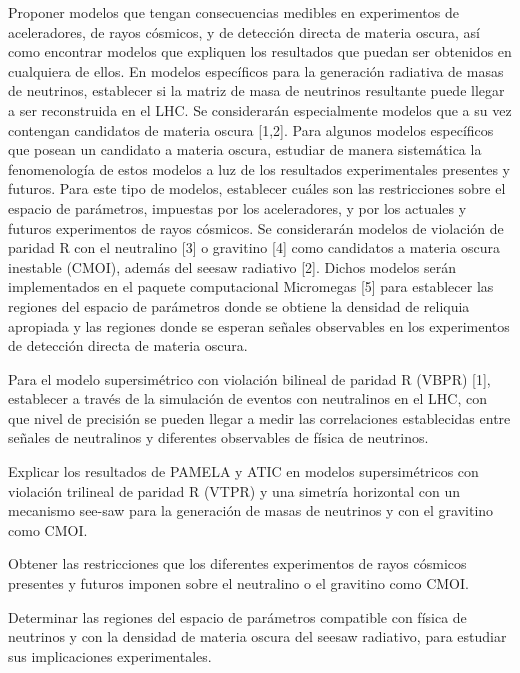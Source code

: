 \begin{ideas}
  

Proponer modelos que tengan consecuencias medibles en experimentos de aceleradores, de rayos cósmicos, y de detección directa de materia oscura, así como encontrar modelos que expliquen los resultados que puedan ser obtenidos en cualquiera de ellos. En modelos específicos para la generación radiativa de masas de neutrinos, establecer si la matriz de masa de neutrinos resultante puede llegar a ser reconstruida en el LHC. Se considerarán especialmente modelos que a su vez contengan candidatos de materia oscura [1,2]. Para algunos modelos específicos que posean un candidato a materia oscura, estudiar de manera sistemática la fenomenología de estos modelos a luz de los resultados experimentales presentes y futuros. Para este tipo de modelos, establecer cuáles son las restricciones sobre el espacio de parámetros, impuestas por los aceleradores, y por los actuales y futuros experimentos de rayos cósmicos. Se considerarán modelos de violación de paridad R con el neutralino [3] o gravitino [4] como candidatos a materia oscura inestable (CMOI), además del seesaw radiativo [2]. Dichos modelos serán implementados en el paquete computacional Micromegas [5] para establecer las regiones del espacio de parámetros donde se obtiene la densidad de reliquia apropiada y las regiones donde se esperan señales observables en los experimentos de detección directa de materia oscura. 


Para el modelo supersimétrico con violación bilineal de paridad R (VBPR) [1],  establecer a través de la simulación de eventos con neutralinos en el LHC, con que nivel de precisión se pueden llegar a medir las correlaciones establecidas entre señales de neutralinos y diferentes observables de física de neutrinos.

Explicar los resultados de PAMELA y ATIC en modelos supersimétricos con violación trilineal de paridad R (VTPR) y una simetría horizontal con un mecanismo see-saw para la generación de masas de neutrinos y con el gravitino como CMOI.

Obtener las restricciones que los diferentes experimentos de rayos cósmicos presentes y futuros imponen sobre el neutralino o el gravitino como CMOI.

Determinar las regiones del espacio de parámetros compatible con física de neutrinos y con la densidad de materia oscura del seesaw radiativo, para estudiar sus implicaciones experimentales.


\end{ideas}


